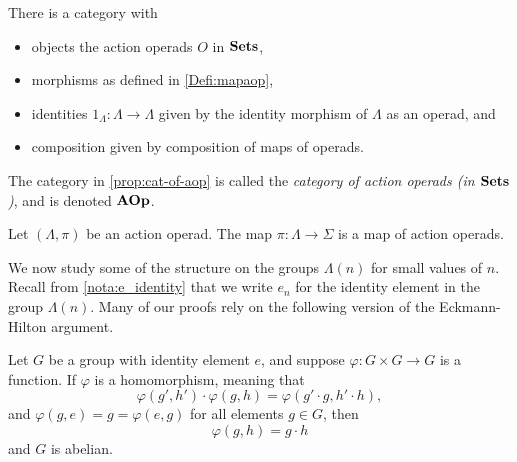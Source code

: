 \begin{prop}\label{prop:cat-of-aop}
There is a category with 
\begin{itemize}
\item objects the action operads $O$ in $\mathbf{Sets}$, 
\item morphisms as defined in \cref{Defi:mapaop},
\item identities $1_\Lambda \colon \Lambda \to \Lambda$ given by the identity morphism of $\Lambda$ as an operad,
and
\item composition given by composition of maps of operads.
\end{itemize}
\end{prop}

\begin{nota}\label{nota:cat_aop}
The category in \cref{prop:cat-of-aop} is called the \emph{category of action operads (in $\mathbf{Sets}$)}, and is denoted $\mathbf{AOp}$.
\end{nota}

\begin{prop}\label{prop:pi-in-aop}
Let $(\Lambda, \pi)$ be an action operad. The map $\pi \colon \Lambda \rightarrow \Sigma$ is a map of action operads.
\end{prop}


We now study some of the structure on the groups $\Lambda(n)$ for small values of $n$. Recall from \cref{nota:e_identity} that we write $e_{n}$ for the identity element in the group $\Lambda(n)$.
Many of our proofs rely on the following version of the Eckmann-Hilton argument.

\begin{prop}\label{prop:EH}
Let $G$ be a group with identity element $e$, and suppose $\varphi \colon G \times G \to G$ is a function. If $\varphi$ is a homomorphism, meaning that
\[
\varphi(g',h') \cdot \varphi(g,h) = \varphi(g' \cdot g, h' \cdot h),
\]
and $\varphi(g,e) = g = \varphi(e,g)$ for all elements $g \in G$, then 
\[
\varphi(g, h) = g \cdot h
\]
and $G$ is abelian.
\end{prop}

